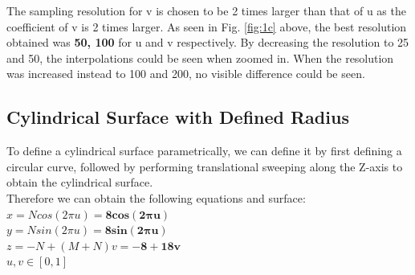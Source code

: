 \documentclass[acmlarge,nonacm=true]{acmart}
\begin{document}
The sampling resolution for v is chosen to be 2 times larger than that of u as the coefficient of v is 
2 times larger. As seen in Fig. \ref{fig:1c} above, the best resolution obtained was \textbf{50, 100} for u and v respectively.
By decreasing the resolution to 25 and 50, the interpolations could be seen when zoomed in. When the resolution was increased
instead to 100 and 200, no visible difference could be seen.

\subsection{Cylindrical Surface with Defined Radius}
\label{section:1d}
To define a cylindrical surface parametrically, we can define it by first 
defining a circular curve, followed by performing translational sweeping along the
Z-axis to obtain the cylindrical surface.\\
Therefore we can obtain the following equations and surface:\\
\(x = Ncos(2\pi u) = \mathbf{8cos(2\pi u)}\)\\
\(y = Nsin(2\pi u) = \mathbf{8sin(2\pi u)}\)\\
\(z = -N + (M+N)v = \mathbf{-8 + 18v}\)\\
\(u,v \in [0,1]\)
\end{document}
